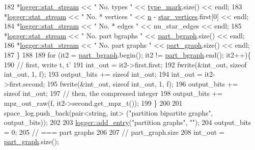 \begin{DoxyCode}
182     *\hyperlink{classlogger_a7db37821f875f2ba3540980b355779f5}{logger::stat\_stream} << \textcolor{stringliteral}{" No. types         "} << 
      \hyperlink{classmarked__graph__compressed_a86b00223525703e973415cbc9c94da68}{type\_mark}.size() << endl;
183     *\hyperlink{classlogger_a7db37821f875f2ba3540980b355779f5}{logger::stat\_stream} << \textcolor{stringliteral}{" No. * vertices    "} << \hyperlink{classmarked__graph__compressed_a8d841016ddb11cfd33748c8deb6277ba}{n} - 
      \hyperlink{classmarked__graph__compressed_a7a4ced4586e2e353f9076bd447df5208}{star\_vertices}.first[0] << endl;
184     *\hyperlink{classlogger_a7db37821f875f2ba3540980b355779f5}{logger::stat\_stream} << \textcolor{stringliteral}{" No. * edges       "} << nu\_star\_edges << endl;
185     *\hyperlink{classlogger_a7db37821f875f2ba3540980b355779f5}{logger::stat\_stream} << \textcolor{stringliteral}{" No. part bgraphs  "} << 
      \hyperlink{classmarked__graph__compressed_a7b3267063fba30b45eb21b3ba4e07536}{part\_bgraph}.size() << endl;
186     *\hyperlink{classlogger_a7db37821f875f2ba3540980b355779f5}{logger::stat\_stream} << \textcolor{stringliteral}{" No. part graphs   "} << 
      \hyperlink{classmarked__graph__compressed_ae179a4737e6eab905c18a94d44ef64b7}{part\_graph}.size() << endl;
187   \}
188 
189   \textcolor{keywordflow}{for} (it2 = \hyperlink{classmarked__graph__compressed_a7b3267063fba30b45eb21b3ba4e07536}{part\_bgraph}.begin(); it2 != \hyperlink{classmarked__graph__compressed_a7b3267063fba30b45eb21b3ba4e07536}{part\_bgraph}.end(); it2++)\{
190     \textcolor{comment}{// first, write t, t'}
191     int\_out = it2->first.first;
192     fwrite(&int\_out, \textcolor{keyword}{sizeof} int\_out, 1, f);
193     output\_bits += \textcolor{keyword}{sizeof} int\_out;
194     int\_out = it2->first.second;
195     fwrite(&int\_out, \textcolor{keyword}{sizeof} int\_out, 1, f);
196     output\_bits += \textcolor{keyword}{sizeof} int\_out;
197     \textcolor{comment}{// then, the compressed integer}
198     output\_bits += mpz\_out\_raw(f, it2->second.get\_mpz\_t());
199   \}
200 
201   space\_log.push\_back(pair<string, int> (\textcolor{stringliteral}{"partition bipartite graphs"}, output\_bits));
202 
203   \hyperlink{classlogger_a710163deb17bc81f70d53d285b8ac9ac}{logger::add\_entry}(\textcolor{stringliteral}{"partition graphs"}, \textcolor{stringliteral}{""});
204   output\_bits = 0;
205   \textcolor{comment}{// === part graphs}
206 
207   \textcolor{comment}{// part\_graph.size}
208   int\_out = \hyperlink{classmarked__graph__compressed_ae179a4737e6eab905c18a94d44ef64b7}{part\_graph}.size();

\end{DoxyCode}
